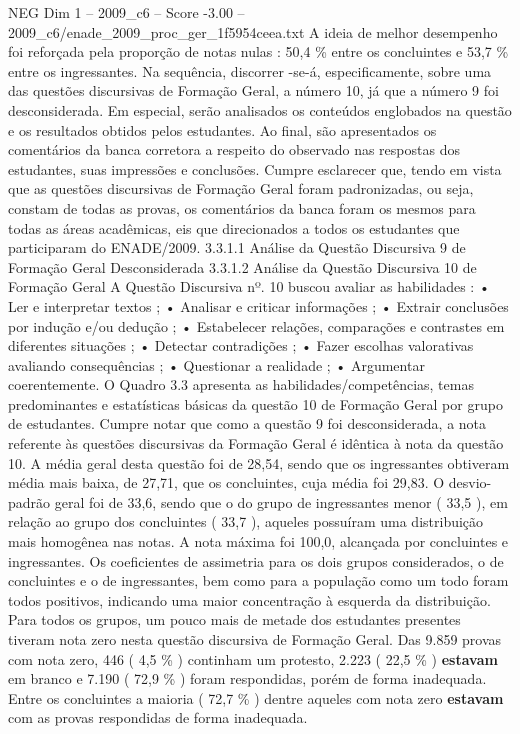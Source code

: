 \begin{textsample}{NEG Dim 1 – 2009\_c6 – Score -3.00 – 2009\_c6/enade\_2009\_proc\_ger\_1f5954ceea.txt}
A ideia de melhor desempenho foi reforçada pela proporção de notas nulas : 50,4 \% entre os concluintes e 53,7 \% entre os ingressantes.
Na sequência, discorrer -se-á, especificamente, sobre uma das questões discursivas de Formação Geral, a número 10, já que a número 9 foi desconsiderada.
Em especial, serão analisados os conteúdos englobados na questão e os resultados obtidos pelos estudantes.
Ao final, são apresentados os comentários da banca corretora a respeito do observado nas respostas dos estudantes, suas impressões e conclusões.
Cumpre esclarecer que, tendo em vista que as questões discursivas de Formação Geral foram padronizadas, ou seja, constam de todas as provas, os comentários da banca foram os mesmos para todas as áreas acadêmicas, eis que direcionados a todos os estudantes que participaram do ENADE/2009. 3.3.1.1 Análise da Questão Discursiva 9 de Formação Geral Desconsiderada 3.3.1.2 Análise da Questão Discursiva 10 de Formação Geral A Questão Discursiva nº. 10 buscou avaliar as habilidades : • Ler e interpretar textos ; • Analisar e criticar informações ; • Extrair conclusões por indução e/ou dedução ; • Estabelecer relações, comparações e contrastes em diferentes situações ; • Detectar contradições ; • Fazer escolhas valorativas avaliando consequências ; • Questionar a realidade ; • Argumentar coerentemente.
O Quadro 3.3 apresenta as habilidades/competências, temas predominantes e estatísticas básicas da questão 10 de Formação Geral por grupo de estudantes.
Cumpre notar que como a questão 9 foi desconsiderada, a nota referente às questões discursivas da Formação Geral é idêntica à nota da questão 10.
A média geral desta questão foi de 28,54, sendo que os ingressantes obtiveram média mais baixa, de 27,71, que os concluintes, cuja média foi 29,83.
O desvio-padrão geral foi de 33,6, sendo que o do grupo de ingressantes menor ( 33,5 ), em relação ao grupo dos concluintes ( 33,7 ), aqueles possuíram uma distribuição mais homogênea nas notas.
A nota máxima foi 100,0, alcançada por concluintes e ingressantes.
Os coeficientes de assimetria para os dois grupos considerados, o de concluintes e o de ingressantes, bem como para a população como um todo foram todos positivos, indicando uma maior concentração à esquerda da distribuição.
Para todos os grupos, um pouco mais de metade dos estudantes presentes tiveram nota zero nesta questão discursiva de Formação Geral.
Das 9.859 provas com nota zero, 446 ( 4,5 \% ) continham um protesto, 2.223 ( 22,5 \% ) \textbf{estavam} em branco e 7.190 ( 72,9 \% ) foram respondidas, porém de forma inadequada.
Entre os concluintes a maioria ( 72,7 \% ) dentre aqueles com nota zero \textbf{estavam} com as provas respondidas de forma inadequada.

\end{textsample}
